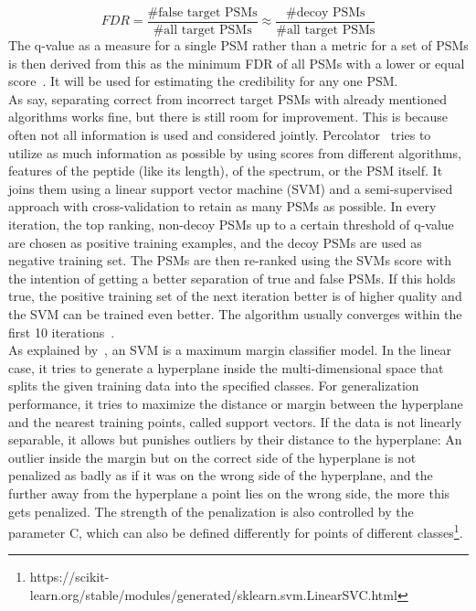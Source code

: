 	\begin{equation}
	FDR = \frac{\text{\# false target PSMs}}{\text{\# all target PSMs}} \approx  \frac{\text{\# decoy PSMs}}{\text{\# all target PSMs}}
	\end{equation}
	The q-value as a measure for a single PSM rather than a metric for a set of PSMs is then derived from this as the minimum FDR of all PSMs with a lower or equal score~\cite{Granholm2012, Aggarwal2016}. It will be used for estimating the credibility for any one PSM.\\
	\label{lab:background:percolator} As \citet{Kll2007} say, separating correct from incorrect target PSMs with already mentioned algorithms works fine, but there is still room for improvement. This is because often not all information is used and considered jointly. Percolator~\cite{Kll2007, Granholm2012} tries to utilize as much information as possible by using scores from different algorithms, features of the peptide (like its length), of the spectrum, or the PSM itself. It joins them using a linear support vector machine (SVM) and a semi-supervised approach with cross-validation to retain as many PSMs as possible. In every iteration, the top ranking, non-decoy PSMs up to a certain threshold of q-value are chosen as positive training examples, and the decoy PSMs are used as negative training set. The PSMs are then re-ranked using the SVMs score with the intention of getting a better separation of true and false PSMs. If this holds true, the positive training set of the next iteration better is of higher quality and the SVM can be trained even better. The algorithm usually converges within the first 10 iterations~\cite{Kll2007}.\\
	As explained by~\citet{Bishop2006}, an SVM is a maximum margin classifier model. In the linear case, it tries to generate a hyperplane inside the multi-dimensional space that splits the given training data into the specified classes. For generalization performance, it tries to maximize the distance or margin between the hyperplane and the nearest training points, called support vectors. If the data is not linearly separable, it allows but punishes outliers by their distance to the hyperplane: An outlier inside the margin but on the correct side of the hyperplane is not penalized as badly as if it was on the wrong side of the hyperplane, and the further away from the hyperplane a point lies on the wrong side, the more this gets penalized. The strength of the penalization is also controlled by the parameter C, which can also be defined differently for points of different classes\footnote{https://scikit-learn.org/stable/modules/generated/sklearn.svm.LinearSVC.html}.\\
